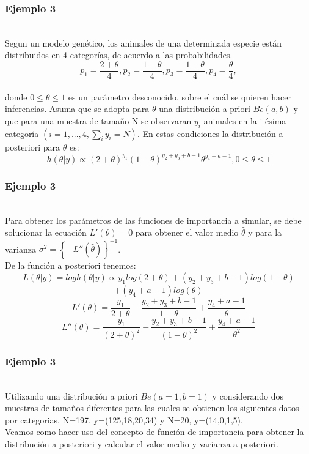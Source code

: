 \documentclass[12pt]{beamer}
\begin{document}
\begin{frame}
\frametitle{Ejemplo 3}
~\\Segun un modelo genético, los animales de una determinada especie están distribuidos en 4 categorías, de acuerdo a las probabilidades.
$$p_{1}=\frac{2+\theta}{4}, p_{2}=\frac{1-\theta}{4}, p_{3}=\frac{1-\theta}{4}, p_{4}=\frac{\theta}{4},$$
~\\donde $0\leq \theta \leq 1$ es un parámetro desconocido, sobre el cuál se quieren hacer inferencias. Asuma que se adopta para $\theta$ una distribución a priori $Be(a,b)$ y que para una muestra de tamaño N se observaran $y_{i}$ animales en la i-ésima categoría $(i=1,...,4, \sum_{i}y_{i}=N)$. En estas condiciones la distribución a posteriori para $\theta$ es:
$$h(\theta|y)\propto(2+\theta)^{y_{1}}(1-\theta)^{y_{2}+y_{3}+b-1}\theta^{y_{4}+a-1},   0\leq\theta\leq1 $$
\end{frame}

\begin{frame}
\frametitle{Ejemplo 3}
~\\Para obtener los parámetros de las funciones de importancia a simular, se debe solucionar la ecuación $L'(\theta)=0$ para obtener el valor medio $\hat{\theta}$ y  para la varianza $\sigma^2=\left\lbrace -L''(\hat{\theta})\right\rbrace ^{-1}$.
~\\De la función a posteriori tenemos:
$$L(\theta|y)=log h(\theta|y)\propto y_{1}log(2+\theta)+(y_{2}+y_{3}+b-1)log(1-\theta)$$
$$+(y_{4}+a-1)log(\theta)$$
$$L'(\theta)=\frac{y_{1}}{2+\theta}-\frac{y_{2}+y_{3}+b-1}{1-\theta}+\frac{y_{4}+a-1}{\theta}$$
$$L''(\theta)=\frac{y_{1}}{(2+\theta)^2}-\frac{y_{2}+y_{3}+b-1}{(1-\theta)^2}+\frac{y_{4}+a-1}{\theta^2}$$
\end{frame}

\begin{frame}
\frametitle{Ejemplo 3}
~\\Utilizando una distribución a priori $Be(a=1,b=1)$ y considerando dos muestras de tamaños diferentes para las cuales se obtienen los siguientes datos por categorias, N=197, y=(125,18,20,34) y N=20, y=(14,0,1,5).
~\\Veamos como hacer uso del concepto de función de importancia para obtener la distribución a posteriori y calcular el valor medio y varianza a posteriori.
\end{frame}
\end{document}
